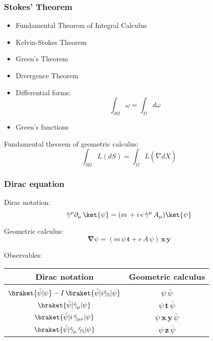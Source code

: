 \documentclass[12pt,xcolor={dvipsnames}]{beamer}
\renewcommand{\vec}{\bm}
\begin{document}
\begin{frame}
  \frametitle{Stokes' Theorem}
  \begin{itemize}
   \item Fundamental Theorem of Integral Calculus
   \item Kelvin-Stokes Theorem
   \item Green's Theorem
   \item Divergence Theorem
   \item Differential forms:
    \begin{equation*}
      \int_{\partial \Omega} \omega = \int_{\Omega} d\omega
    \end{equation*}
   \item Green's functions
  \end{itemize}
  \pause

  Fundamental theorem of geometric calculus:
  \begin{equation*}
    \int_{\partial \Omega} L(dS) = \int_{\Omega} \mathring{L} (
    \mathring{\nabla} dX)
  \end{equation*}
\end{frame}

\begin{frame}
  \frametitle{Dirac equation}
  Dirac notation:
  \begin{equation*}
    \hat{\gamma}^{\mu} \partial_{\mu}\, \ket{\psi}
    = (m\, + i\, e\, \hat{\gamma}^{\mu}\, A_{\mu}) \ket{\psi}
  \end{equation*}
  \pause

  Geometric calculus:
  \begin{equation*}
    \vec{\nabla} \psi = \left( m\, \psi\, \vec{t} + e\, A\, \psi
    \right)\, \vec{x}\, \vec{y}
  \end{equation*}
  \pause

  Observables:
  \begin{table}
    \begin{tabular}{c c}
      Dirac notation & Geometric calculus \\
      \hline \\[-12pt]
      $\braket{\tilde{\psi} | \psi }
      - I\, \braket{\tilde{\psi} | i \hat{\gamma}_{5} | \psi }$
      & $\psi\, \bar{\psi}$ \\
      $\braket{\tilde{\psi} | \hat{\gamma}_{\mu} | \psi }$
      & $\psi\, \vec{t}\, \bar{\psi}$ \\
      $\braket{\tilde{\psi} | i\, \hat{\gamma}_{\mu\nu} | \psi }$
      & $\psi\, \vec{x}\, \vec{y}\, \bar{\psi}$ \\
      $\braket{\tilde{\psi} | \hat{\gamma}_{\mu}\, \hat{\gamma}_{5}
        | \psi }$
      & $\psi\, \vec{z}\, \bar{\psi}$
    \end{tabular}
  \end{table}
\end{frame}
\end{document}

